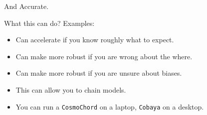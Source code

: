 \documentclass[bigger]{beamer}
\begin{document}
\begin{frame}[label={sec:org34912c4}]{And Accurate.}
\begin{figure}

\end{figure}
\end{frame}

\begin{frame}[fragile,label={sec:org7a68446}]{What this can do?}
 Examples: 
\begin{itemize}
\item Can accelerate if you know \alert{roughly} what to expect.
\item Can make more robust if you are wrong about the where.
\item Can make more robust if you are unsure about biases.
\item This can allow you to chain models.
\item You can run a \texttt{CosmoChord} on a laptop, \texttt{Cobaya} on a desktop.
\end{itemize}
\end{frame}
\end{document}
